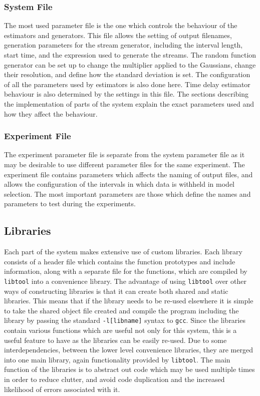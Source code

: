 \documentclass[a4paper,11pt]{article}
\begin{document}
\subsubsection{System File}
\label{sec-3-2-1}

The most used parameter file is the one which controls the behaviour of the
estimators and generators. This file allows the setting of output filenames,
generation parameters for the stream generator, including the interval length,
start time, and the expression used to generate the streams. The random function
generator can be set up to change the multiplier applied to the Gaussians,
change their resolution, and define how the standard deviation is set. The
configuration of all the parameters used by estimators is also done here. Time
delay estimator behaviour is also determined by the settings in this
file. The sections describing the implementation of parts of the system explain
the exact parameters used and how they affect the behaviour.
\subsubsection{Experiment File}
\label{sec-3-2-2}

The experiment parameter file is separate from the system parameter file as it
may be desirable to use different parameter files for the same experiment. The
experiment file contains parameters which affects the naming of output files,
and allows the configuration of the intervals in which data is withheld in model
selection. The most important parameters are those which define the names and
parameters to test during the experiments.
\subsection{Libraries}
\label{sec-3-3}

Each part of the system makes extensive use of custom libraries. Each library
consists of a header file which contains the function prototypes and include
information, along with a separate file for the functions, which are compiled by
\texttt{libtool} into a convenience library. The advantage of using
\texttt{libtool} over other ways of constructing libraries is that it can create
both shared and static libraries. This means that if the library needs to be
re-used elsewhere it is simple to take the shared object file created and
compile the program including the library by passing the standard
\texttt{-l[libname]} syntax to \texttt{gcc}. Since the libraries contain various
functions which are useful not only for this system, this is a useful feature to
have as the libraries can be easily re-used. Due to some interdependencies,
between the lower level convenience libraries, they are merged into one main
library, again functionality provided by \texttt{libtool}. The main function of
the libraries is to abstract out code which may be used multiple times in order
to reduce clutter, and avoid code duplication and the increased likelihood of
errors associated with it. 
\end{document}
